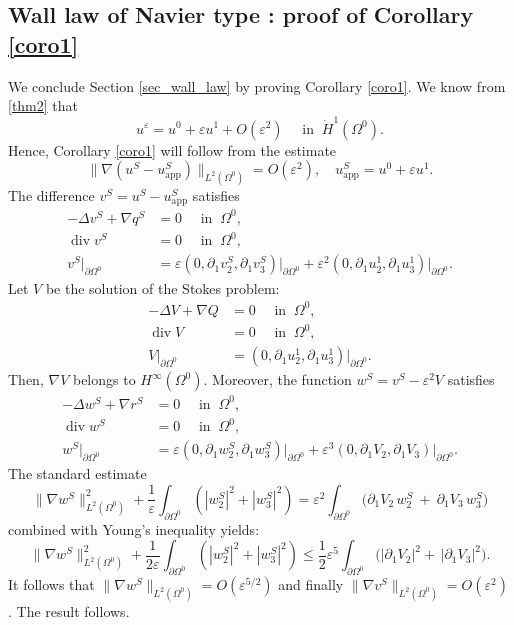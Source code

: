 \documentclass[JEP,XML,SOM,Unicode,NoEqCountersInSection,published]{cedram}
\newcommand{\app}{\mathrm{app}}
\renewcommand{\div}{\operatorname{div}}
\theoremstyle{plain}
\theoremstyle{definition}
\let\pa\partial
\let\na\nabla
\let\eps\varepsilon
\begin{document}
\subsection{Wall law of Navier type : proof of Corollary \ref{coro1}}
We conclude Section \ref{sec_wall_law} by proving Corollary \ref{coro1}.
We know from \eqref{thm2} that
\[
u^\eps = u^0 + \eps u^1 + O(\eps^2) \quad \text{ in } \: \dot{H}^1(\Omega^0).
\]
Hence, Corollary \ref{coro1} will follow from the estimate
\[
\|\na (u^S - u^S_{\app})\|_{L^2(\Omega^0)} = O(\eps^2), \quad u^S_{\app} = u^0 + \eps u^1.
\]
The difference $v^{S} = u^S - u^S_{\app}$ satisfies
\begin{equation*}
\begin{aligned}
-\Delta v^S + \na q^S & = 0 \quad \text{ in } \: \Omega^0, \\
\div v^S & = 0 \quad \text{ in } \: \Omega^0, \\
v^S\vert_{\pa \Omega^0} & = \eps (0, \pa_1 v^S_2, \pa_1 v^S_3)\vert_{\pa \Omega^0} + \eps^2 (0, \pa_1 u^1_2, \pa_1 u^1_3)\vert_{\pa \Omega^0}.
\end{aligned}
\end{equation*}
Let $V$ be the solution of the Stokes problem:
\begin{equation*}
\begin{aligned}
-\Delta V + \na Q & = 0 \quad \text{ in } \: \Omega^0, \\
\div V & = 0 \quad \text{ in } \: \Omega^0, \\
V\vert_{\pa \Omega^0} & = (0, \pa_1 u^1_2, \pa_1 u^1_3)\vert_{\pa \Omega^0}.
\end{aligned}
\end{equation*}
Then, $\na V$ belongs to $H^\infty(\Omega^0)$. Moreover, the function $w^S = v^S - \eps^2 V$ satisfies
\begin{equation*}
\begin{aligned}
-\Delta w^S + \na r^S & = 0 \quad \text{ in } \: \Omega^0, \\
\div w^S & = 0 \quad \text{ in } \: \Omega^0, \\
w^S\vert_{\pa \Omega^0} & = \eps (0, \pa_1 w^S_2, \pa_1 w^S_3)\vert_{\pa \Omega^0} + \eps^3 (0, \pa_1 V_2, \pa_1 V_3)\vert_{\pa \Omega^0}.
\end{aligned}
\end{equation*}
The standard estimate
\begin{equation*}
\|\na w^S\|_{L^2(\Omega^0)}^2 + \frac{1}{\eps} \int_{\pa \Omega^0}
(|w^S_2|^2 + |w^S_3|^2) = \eps^2 \int_{\pa \Omega^0} \big(\pa_1 V_2 \, w^S_2 \: + \: \pa_1 V_3 \, w^S_3\big)
\end{equation*}
combined with Young's inequality yields:
\begin{equation*}
\|\na w^S\|_{L^2(\Omega^0)}^2 + \frac{1}{2\eps} \int_{\pa \Omega^0} (|w^S_2|^2 + |w^S_3|^2) \le \frac{1}{2}\eps^5 \int_{\pa \Omega^0} \big(|\pa_1 V_2|^2 + \, |\pa_1 V_3|^2 \big).
\end{equation*}
It follows that
$\|\na w^S\|_{L^2(\Omega^0)} = O(\eps^{5/2})$ and finally $\|\na v^S\|_{L^2(\Omega^0)} = O(\eps^2)$. The result follows.
\end{document}
